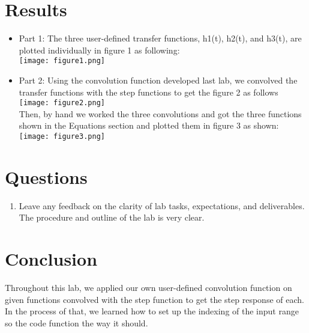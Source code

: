 \documentclass[12pt]{report}
\begin{document}
\section{Results}
\begin{itemize}
    \item Part 1:
    The three user-defined transfer functions, h1(t), h2(t), and h3(t), are plotted individually in figure 1 as following:\\
    \texttt{[image: figure1.png]}\\
    
     \item Part 2:
    Using the convolution function developed last lab, we convolved the transfer functions with the step functions to get the figure 2 as follows\\
    \texttt{[image: figure2.png]}\\
    
    Then, by hand we worked the three convolutions and got the three functions shown in the Equations section and plotted them in figure 3 as shown:\\
    \texttt{[image: figure3.png]}\\
    
\end{itemize}

\section{Questions}

\begin{enumerate}
    \item 
     Leave any feedback on the clarity of lab tasks, expectations, and deliverables.\\
     
     The procedure and outline of the lab is very clear.  
\end{enumerate}

\section{Conclusion}

Throughout this lab, we applied our own user-defined convolution function on given functions convolved with the step function to get the step response of each. In the process of that, we learned how to set up the indexing of the input range so the code function the way it should.
\end{document}
